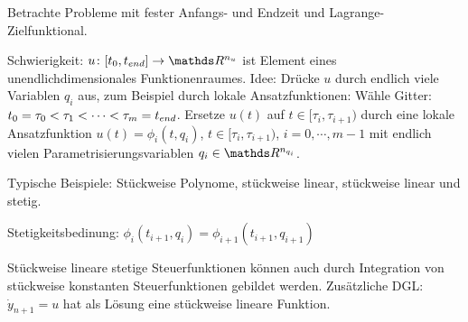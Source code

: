 

Betrachte \obda Probleme mit fester Anfangs- und Endzeit und Lagrange-Zielfunktional.

Schwierigkeit: $u\colon [t_0,\tend] \to \R^{n_u}$ ist Element eines unendlichdimensionales Funktionenraumes. Idee: Drücke $u$ durch endlich viele Variablen $q_i$ aus, zum Beispiel durch lokale Ansatzfunktionen:
Wähle Gitter: $t_0 = \tau_0 < \tau_1 < \cdots < \tau_m = {t_{end}}$. Ersetze $u(t)$ auf $t \in [\tau_i, \tau_{i+1})$ durch eine lokale Ansatzfunktion $u(t) = \phi_i(t,q_i)$, $t \in [\tau_i, \tau_{i+1})$, $i = 0, \cdots, m-1$ mit endlich vielen Parametrisierungsvariablen $q_i \in \R^{n_{q_i}}$.

Typische Beispiele: Stückweise Polynome, stückweise linear, stückweise linear und stetig.

Stetigkeitsbedinung: $\phi_i (t_{i+1}, q_i) = \phi_{i+1} (t_{i+1}, q_{i+1})$


Stückweise lineare stetige Steuerfunktionen können auch durch Integration von stückweise konstanten Steuerfunktionen gebildet werden. Zusätzliche DGL: $\dot y_{n+1} = u$ hat als Lösung eine stückweise lineare Funktion.












